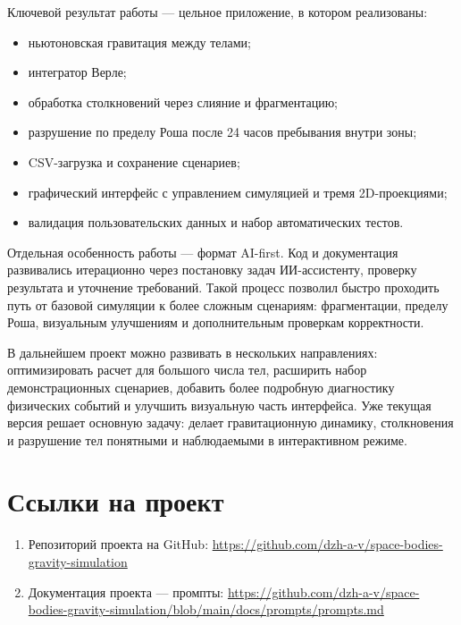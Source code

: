 \documentclass[14pt,a4paper]{extarticle}
\begin{document}
	Ключевой результат работы --- цельное приложение, в котором реализованы:
	\begin{itemize}
		\item ньютоновская гравитация между телами;
		\item интегратор Верле;
		\item обработка столкновений через слияние и фрагментацию;
		\item разрушение по пределу Роша после 24 часов пребывания внутри зоны;
		\item CSV-загрузка и сохранение сценариев;
		\item графический интерфейс с управлением симуляцией и тремя 2D-проекциями;
		\item валидация пользовательских данных и набор автоматических тестов.
	\end{itemize}
	
	
	Отдельная особенность работы --- формат AI-first. Код и документация развивались итерационно через постановку задач ИИ-ассистенту, проверку результата и уточнение требований. Такой процесс позволил быстро проходить путь от базовой симуляции к более сложным сценариям: фрагментации, пределу Роша, визуальным улучшениям и дополнительным проверкам корректности.
	
	В дальнейшем проект можно развивать в нескольких направлениях: оптимизировать расчет для большого числа тел, расширить набор демонстрационных сценариев, добавить более подробную диагностику физических событий и улучшить визуальную часть интерфейса. Уже текущая версия решает основную задачу: делает гравитационную динамику, столкновения и разрушение тел понятными и наблюдаемыми в интерактивном режиме.
	
\section{Ссылки на проект}
\begin{enumerate}
	\item Репозиторий проекта на GitHub: \url{https://github.com/dzh-a-v/space-bodies-gravity-simulation}
	\item Документация проекта --- промпты: \url{https://github.com/dzh-a-v/space-bodies-gravity-simulation/blob/main/docs/prompts/prompts.md}
\end{enumerate}
\end{document}
